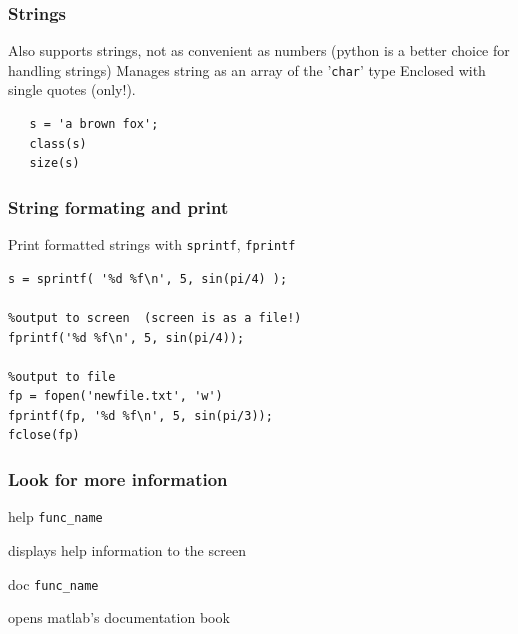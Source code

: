 \documentclass[11pt]{beamer}
\begin{document}
\begin{frame}[fragile]
  \frametitle{Strings}
  \Enlarge

  \begin{enumerate}
  \myitem  Also supports strings, not as convenient as numbers (python is a better choice for handling strings) \pause
  \myitem Manages string as an array of the '\texttt{char}' type \pause
  \myitem  Enclosed with single quotes (only!).
  \end{enumerate}
  
  \begin{Verbatim}
   s = 'a brown fox';
   class(s)
   size(s)
  \end{Verbatim}
\end{frame}

\begin{frame}[fragile]
  \frametitle{String formating and print}
  \Enlarge

  \begin{enumerate}
  \myitem  Print formatted strings with \texttt{sprintf}, \texttt{fprintf}
  \end{enumerate}
  \begin{Verbatim}
s = sprintf( '%d %f\n', 5, sin(pi/4) ); 

%output to screen  (screen is as a file!)
fprintf('%d %f\n', 5, sin(pi/4)); 

%output to file
fp = fopen('newfile.txt', 'w')
fprintf(fp, '%d %f\n', 5, sin(pi/3));
fclose(fp)
\end{Verbatim}
\end{frame}


\begin{frame}[fragile]
  \frametitle{Look for more information}
  \Enlarge

  \begin{enumerate}
    \myitem  help \texttt{func\_name}   
    	\begin{enumerate}
	\mysubitem displays help information to the screen
	\end{enumerate}
    \myitem  doc \texttt{func\_name}   
    	\begin{enumerate}
	\mysubitem opens matlab's documentation book
	\end{enumerate}\pause
  \end{enumerate}

\end{frame}


\end{document}

